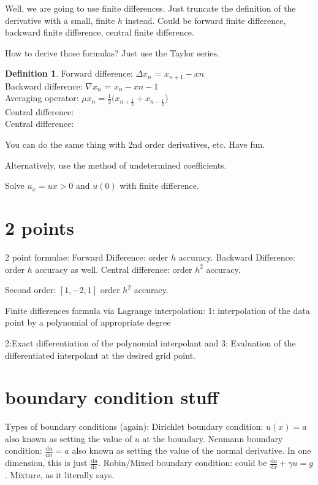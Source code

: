 \documentclass{article}
\numberwithin{equation}{section}
\theoremstyle{definition}
\newtheorem{definition}{Definition}[section]
\newcommand{\dd}[2]{\frac{\mathrm{d} #1}{\mathrm{d} #2}}
\begin{document}
Well, we are going to use finite differences.
Just truncate the definition of the derivative with a small, finite $h$ instead.
Could be forward finite difference, backward finite difference, central finite difference.


How to derive those formulas? Just use the Taylor series.

\begin{definition}
    Forward difference: $\Delta x_n$ = $x_{n+1}-x{n}$ \\
    Backward difference: $\nabla x_n$ = $x_n - x{n-1}$ \\
    Averaging operator: $\mu x_n = \frac 12 (x_{n+\frac 12} + x_{n-\frac 12}$) \\
    Central difference: \\
    Central difference: 
\end{definition}
You can do the same thing with 2nd order derivatives, etc. Have fun.


Alternatively, use the method of undetermined coefficients.


Solve $u_x = u x>0$ and $u(0)$ with finite difference.



\section{2 points}
2 point formulae:
Forward Difference: order $h$ accuracy.
Backward Difference: order $h$ accuracy as well.
Central difference: order $h^2$ accuracy.

Second order: $[1,-2,1]$ order $h^2$ accuracy.



Finite differences formula via Lagrange interpolation:
1: interpolation of the data point by a polynomial of appropriate degree

2:Exact differentiation of the polynomial interpolant and
3: Evaluation of the differentiated interpolant at the desired grid point.

\section{boundary condition stuff}


Types of boundary conditions (again):
Dirichlet boundary condition: $u(x) = a$
also known as setting the value of $u$ at the boundary.
Neumann boundary condition: $\dd{u}{n} = a$
also known as setting the value of the normal derivative. In one dimension, this is just $\dd{u}{x}$.
Robin/Mixed boundary condition: could be $\dd{u}{x} + \gamma u = g$. Mixture, as it literally says.
\end{document}
